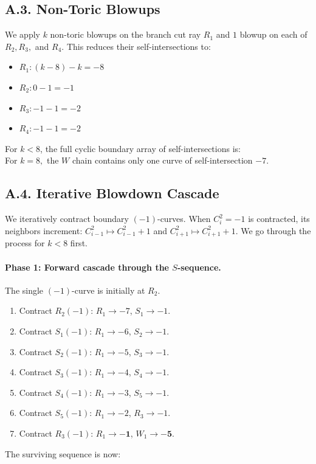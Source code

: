 \documentclass[11pt, reqno]{amsart}
\theoremstyle{definition}
\begin{document}
\subsection*{A.3. Non-Toric Blowups}
We apply $k$ non-toric blowups on the branch cut ray $R_1$ and $1$ blowup on each of $R_2, R_3,$ and $R_4$. This reduces their self-intersections to:
\begin{itemize}
    \item $R_1: (k - 8) - k = -8$
    \item $R_2: 0 - 1 = -1$
    \item $R_3: -1 - 1 = -2$
    \item $R_4: -1 - 1 = -2$
\end{itemize}
For $k<8$, the full cyclic boundary array of self-intersections is:
\begin{equation}
    [\mathbf{R_1(-8)}, \mathbf{R_2(-1)}, S_1(-2), \dots, S_5(-2), \mathbf{R_3(-2)}, W_1(-6), \dots, W_{9-k}(-3), \mathbf{R_4(-2)}, T_1(-2)]
\end{equation} For $k=8,$ the $W$ chain contains only one curve of self-intersection $-7.$

\subsection*{A.4. Iterative Blowdown Cascade}
We iteratively contract boundary $(-1)$-curves. When $C_i^2 = -1$ is contracted, its neighbors increment: $C_{i-1}^2 \mapsto C_{i-1}^2 + 1$ and $C_{i+1}^2 \mapsto C_{i+1}^2 + 1$. We go through the process for $k<8$ first.

\paragraph{Phase 1: Forward cascade through the $S$-sequence.}
The single $(-1)$-curve is initially at $R_2$.
\begin{enumerate}
    \item Contract $R_2(-1)$: $R_1 \to -7$, $S_1 \to -1$.
    \item Contract $S_1(-1)$: $R_1 \to -6$, $S_2 \to -1$.
    \item Contract $S_2(-1)$: $R_1 \to -5$, $S_3 \to -1$.
    \item Contract $S_3(-1)$: $R_1 \to -4$, $S_4 \to -1$.
    \item Contract $S_4(-1)$: $R_1 \to -3$, $S_5 \to -1$.
    \item Contract $S_5(-1)$: $R_1 \to -2$, $R_3 \to -1$.
    \item Contract $R_3(-1)$: $R_1 \to \mathbf{-1}$, $W_1 \to \mathbf{-5}$.
\end{enumerate}
The surviving sequence is now:
\begin{equation}
    [\mathbf{R_1(-1)}, \mathbf{W_1(-5)}, W_2(-2), \dots, W_{9-k}(-3), R_4(-2), \mathbf{T_1(-2)}]
\end{equation}
\end{document}
